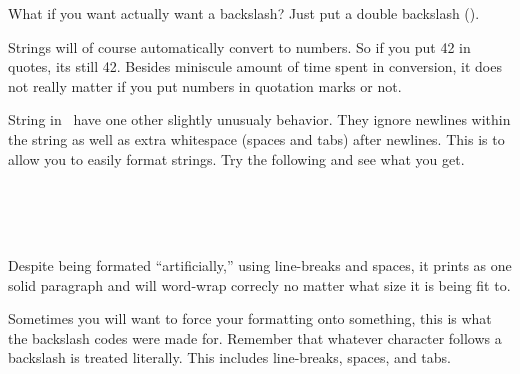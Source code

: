 \documentclass{book}
\begin{document}
What if you want actually want a backslash?  Just put a double backslash (\SSCode{\textbackslash\textbackslash}).

Strings will of course automatically convert to numbers.  So if you put 42 in quotes, its still 42.  Besides miniscule amount of time spent in conversion, it does not really matter if you put numbers in quotation marks or not.

String in \SSquared\ have one other slightly unusualy behavior.  They ignore newlines within the string as well as extra whitespace (spaces and tabs) after newlines.  This is to allow you to easily format strings.  Try the following and see what you get.


\begin{SSCodeBox}
\scitea{ }
 \\
 \\
 \\
\scitea{;}
\end{SSCodeBox}

Despite being formated ``artificially,'' using line-breaks and spaces, it prints as one solid paragraph and will word-wrap correcly no matter what size it is being fit to.

Sometimes you will want to force your formatting onto something, this is what the backslash codes were made for.  Remember that whatever character follows a backslash is treated literally.  This includes line-breaks, spaces, and tabs.
\end{document}
